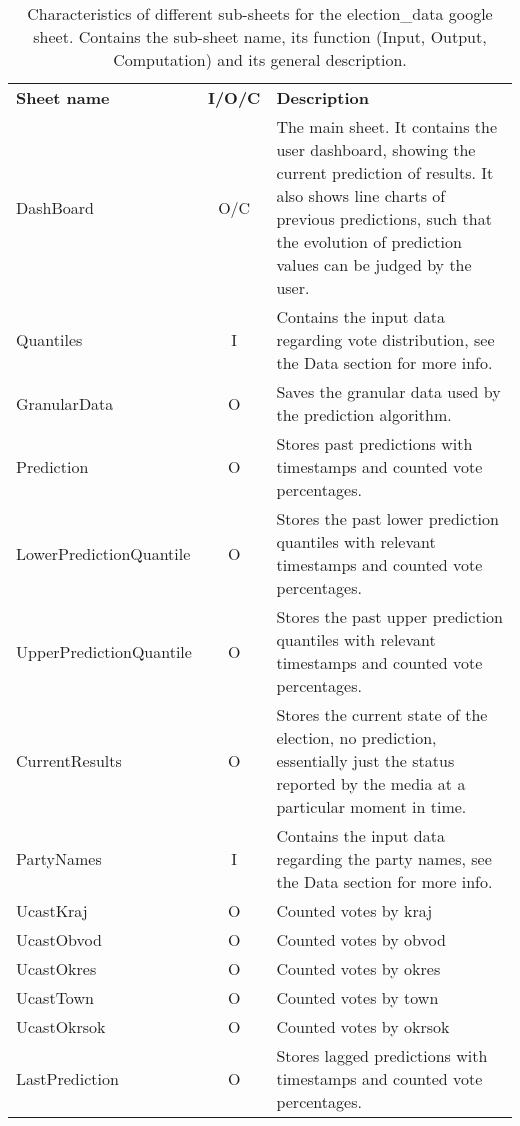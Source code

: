 \documentclass[12pt]{article}
\begin{document}
\begin{table}[h]
	\centering
	\begin{tabularx}{\linewidth}{lcX}
		\toprule
		\textbf{Sheet name} & \textbf{I/O/C} & \textbf{Description}\\
		DashBoard & O/C & The main sheet. It contains the user dashboard, showing the current prediction of results. It also shows line charts of previous predictions, such that the evolution of prediction values can be judged by the user. \\
		Quantiles & I & Contains the input data regarding vote distribution, see the Data section for more info. \\
		GranularData & O & Saves the granular data used by the prediction algorithm. \\
		Prediction & O & Stores past predictions with timestamps and counted vote percentages. \\
		LowerPredictionQuantile & O & Stores the past lower prediction quantiles with relevant timestamps and counted vote percentages. \\
		UpperPredictionQuantile & O & Stores the past upper prediction quantiles with relevant timestamps and counted vote percentages. \\				
		CurrentResults & O & Stores the current state of the election, no prediction, essentially just the status reported by the media at a particular moment in time. \\	
		PartyNames & I & Contains the input data regarding the party names, see the Data section for more info.\\
		UcastKraj & O & Counted votes by kraj\\
		UcastObvod & O & Counted votes by obvod\\
		UcastOkres & O & Counted votes by okres\\					
		UcastTown & O & Counted votes by town\\			
		UcastOkrsok & O & Counted votes by okrsok\\
		LastPrediction & O & Stores lagged predictions with timestamps and counted vote percentages. \\
		\bottomrule
	\end{tabularx}
	\caption{Characteristics of different sub-sheets for the election\_data google sheet. Contains the sub-sheet name, its function (Input, Output, Computation) and its general description.}
	\label{tab:google_sheets_structure:election_data}
\end{table}
\end{document}
